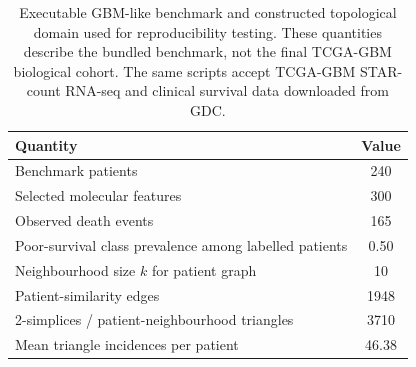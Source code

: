 \begin{table}[t]
\centering
\caption{Executable GBM-like benchmark and constructed topological domain used for reproducibility testing. These quantities describe the bundled benchmark, not the final TCGA-GBM biological cohort. The same scripts accept TCGA-GBM STAR-count RNA-seq and clinical survival data downloaded from GDC.}
\label{tab:cohort_complex}
\small
\begin{tabular}{lc}
\toprule
Quantity & Value \\
\midrule
Benchmark patients & 240 \\
Selected molecular features & 300 \\
Observed death events & 165 \\
Poor-survival class prevalence among labelled patients & 0.50 \\
Neighbourhood size $k$ for patient graph & 10 \\
Patient-similarity edges & 1948 \\
2-simplices / patient-neighbourhood triangles & 3710 \\
Mean triangle incidences per patient & 46.38 \\
\bottomrule
\end{tabular}
\end{table}